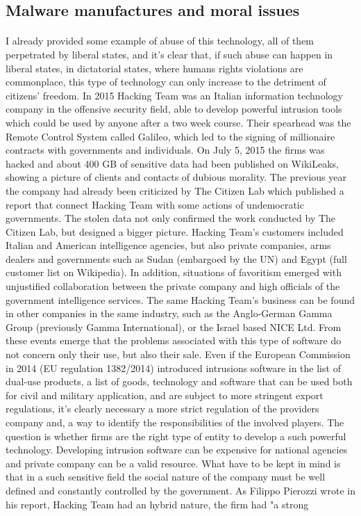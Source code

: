 \subsection*{Malware manufactures and moral issues}
\paragraph{}
I already provided some example of abuse of this technology, all of them perpetrated by liberal states, and it's clear that, if such abuse can happen in liberal states, in dictatorial states, where humans rights violations are commonplace, this type of technology can only increase to the detriment of citizens' freedom. In 2015
Hacking Team was an Italian information technology company in the offensive security field, able to develop powerful intrusion tools which could be used by anyone after a two week course. Their spearhead was the Remote Control System called Galileo, which led to the signing of millionaire contracts with governments and individuals. On July 5, 2015 the firms was hacked and about 400 GB of sensitive data had been published on WikiLeaks, showing a picture of clients and contacts of dubious morality. The previous year the company had already been criticized by The Citizen Lab which published a report\cite{ht_citizenlab} that connect Hacking Team with some actions of undemocratic governments. The stolen data not only confirmed the work conducted by The Citizen Lab, but designed a bigger picture. Hacking Team's customers included Italian and American intelligence agencies, but also private companies, arms dealers and governments such as Sudan (embargoed by the UN) and Egypt (full customer list on Wikipedia\cite{ht_wikipedia}). In addition, situations of favoritism emerged with unjustified collaboration between the private company and high officials of the government intelligence services\cite{attacco_ai_pirati}. The same Hacking Team's business can be found in other companies in the same industry, such as the Anglo-German Gamma Group (previously Gamma International), or the Israel based NICE Ltd. From these events emerge that the problems associated with this type of software do not concern only their use, but also their sale. Even if the European Commission in 2014 (EU regulation 1382/2014\cite{eu_1382/2014}) introduced intrusions software in the list of dual-use products, a list of goods, technology and software that can be used both for civil and military application, and are subject to more stringent export regulations, it's clearly necessary a more strict regulation of the providers company\cite{trojan_and_export} and, a way to identify the responsibilities of the involved players. The question is whether firms are the right type of entity to develop a such powerful technology. Developing intrusion software can be expensive for national agencies and private company can be a valid resource. What have to be kept in mind is that in a such sensitive field the social nature of the company must be well defined and constantly controlled by the government. As Filippo Pierozzi wrote in his report, Hacking Team had an hybrid nature, the firm had "a strong 